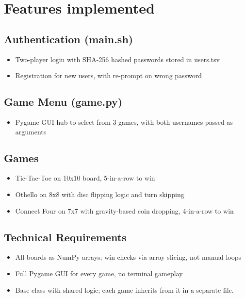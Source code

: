 \documentclass{report}
\begin{document}
\section{Features implemented}
\subsection{Authentication (main.sh)}
\begin{itemize}
    \item Two-player login with SHA-256 hashed passwords stored in users.tsv \\
    \item Registration for new users, with re-prompt on wrong password 
\end{itemize}
\subsection{Game Menu (game.py)}
\begin{itemize}
    \item Pygame GUI hub to select from 3 games, with both usernames passed as arguments \\ 
\end{itemize}
\subsection{Games}
\begin{itemize}
    \item Tic-Tac-Toe on 10x10 board, 5-in-a-row to win \\ 
    \item Othello on 8x8 with disc flipping logic and turn skipping \\ 
    \item Connect Four on 7x7 with gravity-based coin dropping, 4-in-a-row to win 
\end{itemize}
\subsection{Technical Requirements}
\begin{itemize}
    \item All boards as NumPy arrays; win checks via array slicing, not manual loops \\ 
    \item Full Pygame GUI for every game, no terminal gameplay \\ 
    \item Base class with shared logic; each game inherits from it in a separate file.
\end{itemize}
\end{document}
